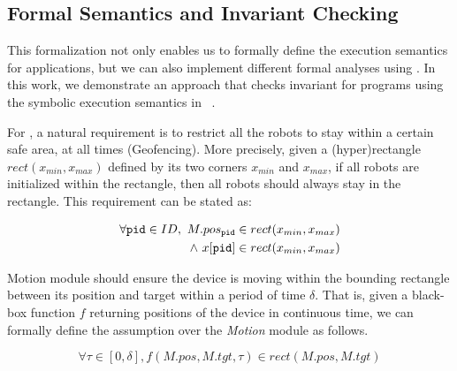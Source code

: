 \subsection{Formal Semantics and Invariant Checking}

This formalization not only enables us to formally define the execution semantics for \lgname applications, 
but we can also implement different formal analyses using  \K.
In this work, we demonstrate an approach that checks invariant for \lgname programs using the symbolic execution semantics in \K~\cite{}.

For \LineForm, a natural requirement is to restrict all the robots to stay within a certain safe area, at all times (Geofencing).
More precisely, given a (hyper)rectangle $rect(x_{min}, x_{max})$ defined by its two corners $x_{min}$ and $x_{max}$,
if all robots are initialized within the rectangle, then all robots should always stay in the rectangle. This requirement can be stated as:
\begin{invariant}\label{inv:lineform}
\[
\begin{split}
    \forall \texttt{pid} \in ID,\ M.pos_{\texttt{pid}} \in rect(x_{min}, x_{max}) \\
    \land\ x[\texttt{pid}] \in rect(x_{min}, x_{max})
\end{split}
\]
\end{invariant}


Motion module should ensure the device is moving within the bounding rectangle between its position and target
within a period of time $\delta$.
That is, given a black-box function $f$ returning positions of the device in continuous time,
we can formally define the assumption over the \emph{Motion} module as follows.
\begin{assumption}\label{lineform-assume}
\[
\forall \tau \in [0, \delta], f(M.pos, M.tgt, \tau) \in rect(M.pos, M.tgt)
\]
\end{assumption}

